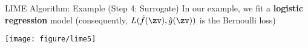 \documentclass[10pt,compress,t,notes=noshow, xcolor=table]{beamer}
\newcommand{\gh}{\hat{g}}
\begin{document}
\begin{frame}[c]{LIME Algorithm: Example (Step 4: Surrogate) }
		In our example, we fit a \textbf{logistic regression} model (consequently, $L(\fh(\zv), \gh(\zv))$ is the Bernoulli loss)
		\begin{center}
			\texttt{[image: figure/lime5]}
		\end{center}
\end{frame}

\endlecture
\end{document}
